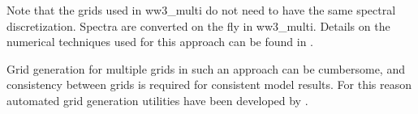 Note that the grids used in {\file ww3\_multi} do not need to have the same
spectral discretization. Spectra are converted on the fly in {\file
ww3\_multi}. Details on the numerical techniques used for this approach can be
found in \citet[section 3.5.5]{tol:MMAB07b}.

Grid generation for multiple grids in such an approach can be cumbersome, and
consistency between grids is required for consistent model results. For this
reason automated grid generation utilities have been developed by
\cite{tol:MMAB07a, tol:OMOD08a}.


\bpage
